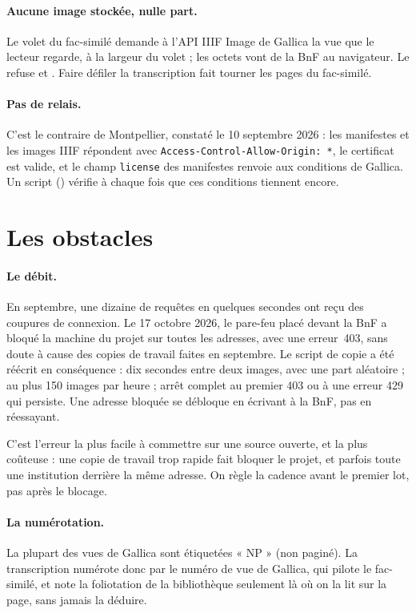 \paragraph{Aucune image stockée, nulle part.} Le volet du fac-similé demande à l'API IIIF
Image de Gallica la vue que le lecteur regarde, à la largeur du volet ; les octets vont de
la BnF au navigateur. Le  refuse  et .
Faire défiler la transcription fait tourner les pages du fac-similé.

\paragraph{Pas de relais.} C'est le contraire de Montpellier, constaté le 10 septembre
2026 : les manifestes et les images IIIF répondent avec \texttt{Access-Control-Allow-Origin:
*}, le certificat est valide, et le champ \texttt{license} des manifestes renvoie aux
conditions de Gallica. Un script () vérifie à chaque fois que ces
conditions tiennent encore.

\section{Les obstacles}

\paragraph{Le débit.} En septembre, une dizaine de requêtes en quelques secondes ont reçu
des coupures de connexion. Le 17 octobre 2026, le pare-feu placé devant la BnF a bloqué la
machine du projet sur toutes les adresses, avec une erreur~403, sans doute à cause des
copies de travail faites en septembre. Le script de copie a été réécrit en conséquence :
dix secondes entre deux images, avec une part aléatoire ; au plus 150 images par heure ;
arrêt complet au premier 403 ou à une erreur 429 qui persiste. Une adresse bloquée se
débloque en écrivant à la BnF, pas en réessayant.

\begin{warningblock}
C'est l'erreur la plus facile à commettre sur une source ouverte, et la plus coûteuse : une
copie de travail trop rapide fait bloquer le projet, et parfois toute une institution
derrière la même adresse. On règle la cadence avant le premier lot, pas après le blocage.
\end{warningblock}

\paragraph{La numérotation.} La plupart des vues de Gallica sont étiquetées « NP » (non
paginé). La transcription numérote donc par le numéro de vue de Gallica, qui pilote le
fac-similé, et note la foliotation de la bibliothèque seulement là où on la lit sur la
page, sans jamais la déduire.

